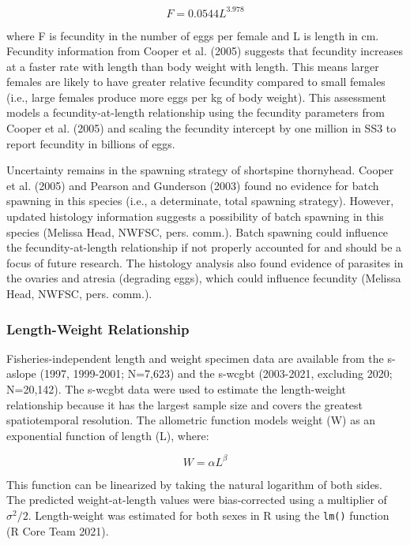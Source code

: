\documentclass[11pt,
  english,
  letterpaper,
]{article}
\begin{document}
\begin{equation} F = 0.0544L^{3.978} \end{equation}

where F is fecundity in the number of eggs per female and L is length in cm. Fecundity information from Cooper et al. (2005) suggests that fecundity increases at a faster rate with length than body weight with length. This means larger females are likely to have greater relative fecundity compared to small females (i.e., large females produce more eggs per kg of body weight). This assessment models a fecundity-at-length relationship using the fecundity parameters from Cooper et al. (2005) and scaling the fecundity intercept by one million in SS3 to report fecundity in billions of eggs.

Uncertainty remains in the spawning strategy of shortspine thornyhead. Cooper et al. (2005) and Pearson and Gunderson (2003) found no evidence for batch spawning in this species (i.e., a determinate, total spawning strategy). However, updated histology information suggests a possibility of batch spawning in this species (Melissa Head, NWFSC, pers. comm.). Batch spawning could influence the fecundity-at-length relationship if not properly accounted for and should be a focus of future research. The histology analysis also found evidence of parasites in the ovaries and atresia (degrading eggs), which could influence fecundity (Melissa Head, NWFSC, pers. comm.).

\hypertarget{length-weight-relationship}{%
\subsubsection{Length-Weight Relationship}\label{length-weight-relationship}}

Fisheries-independent length and weight specimen data are available from the \gls{s-aslope} (1997, 1999-2001; N=7,623) and the \gls{s-wcgbt} (2003-2021, excluding 2020; N=20,142). The \gls{s-wcgbt} data were used to estimate the length-weight relationship because it has the largest sample size and covers the greatest spatiotemporal resolution. The allometric function models weight (W) as an exponential function of length (L), where:

\begin{equation} W = \alpha L^{\beta} \end{equation}

This function can be linearized by taking the natural logarithm of both sides. The predicted weight-at-length values were bias-corrected using a multiplier of \(\sigma^2 / 2\). Length-weight was estimated for both sexes in R using the \texttt{lm()} function (R Core Team 2021).
\end{document}
